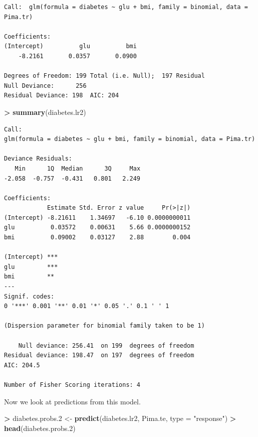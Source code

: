\documentclass[
]{krantz}
\makeatletter
\newenvironment{Shaded}{\begin{snugshade}}{\end{snugshade}}
\newcommand{\DataTypeTok}[1]{\textcolor[rgb]{0.27,0.27,0.27}{#1}}
\newcommand{\FloatTok}[1]{\textcolor[rgb]{0.06,0.06,0.06}{#1}}
\newcommand{\KeywordTok}[1]{\textcolor[rgb]{0.27,0.27,0.27}{\textbf{#1}}}
\newcommand{\NormalTok}[1]{#1}
\newcommand{\OperatorTok}[1]{\textcolor[rgb]{0.43,0.43,0.43}{\textbf{#1}}}
\newcommand{\StringTok}[1]{\textcolor[rgb]{0.5,0.5,0.5}{#1}}
\newenvironment{kframe}{%
\medskip{}
\setlength{\fboxsep}{.8em}
 \def\at@end@of@kframe{}%
 \ifinner\ifhmode%
  \def\at@end@of@kframe{\end{minipage}}%
  \begin{minipage}{\columnwidth}%
 \fi\fi%
 \def\FrameCommand##1{\hskip\@totalleftmargin \hskip-\fboxsep
 \colorbox{shadecolor}{##1}\hskip-\fboxsep
     \hskip-\linewidth \hskip-\@totalleftmargin \hskip\columnwidth}%
 \MakeFramed {\advance\hsize-\width
   \@totalleftmargin\z@ \linewidth\hsize
   \@setminipage}}%
 {\par\unskip\endMakeFramed%
 \at@end@of@kframe}
\renewenvironment{Shaded}{\begin{kframe}}{\end{kframe}}
\makeatother
\begin{document}
\begin{verbatim}
Call:  glm(formula = diabetes ~ glu + bmi, family = binomial, data = Pima.tr)

Coefficients:
(Intercept)          glu          bmi  
    -8.2161       0.0357       0.0900  

Degrees of Freedom: 199 Total (i.e. Null);  197 Residual
Null Deviance:      256 
Residual Deviance: 198  AIC: 204
\end{verbatim}

\begin{Shaded}
\begin{Highlighting}[]
\OperatorTok{\textgreater{}}\StringTok{ }\KeywordTok{summary}\NormalTok{(diabetes.lr2)}
\end{Highlighting}
\end{Shaded}

\begin{verbatim}
Call:
glm(formula = diabetes ~ glu + bmi, family = binomial, data = Pima.tr)

Deviance Residuals: 
   Min      1Q  Median      3Q     Max  
-2.058  -0.757  -0.431   0.801   2.249  

Coefficients:
            Estimate Std. Error z value     Pr(>|z|)
(Intercept) -8.21611    1.34697   -6.10 0.0000000011
glu          0.03572    0.00631    5.66 0.0000000152
bmi          0.09002    0.03127    2.88        0.004
               
(Intercept) ***
glu         ***
bmi         ** 
---
Signif. codes:  
0 '***' 0.001 '**' 0.01 '*' 0.05 '.' 0.1 ' ' 1

(Dispersion parameter for binomial family taken to be 1)

    Null deviance: 256.41  on 199  degrees of freedom
Residual deviance: 198.47  on 197  degrees of freedom
AIC: 204.5

Number of Fisher Scoring iterations: 4
\end{verbatim}

Now we look at predictions from this model.

\begin{Shaded}
\begin{Highlighting}[]
\OperatorTok{\textgreater{}}\StringTok{ }\NormalTok{diabetes.probs}\FloatTok{.2}\NormalTok{ \textless{}{-}}\StringTok{ }\KeywordTok{predict}\NormalTok{(diabetes.lr2, Pima.te, }\DataTypeTok{type =} \StringTok{"response"}\NormalTok{)}
\OperatorTok{\textgreater{}}\StringTok{ }\KeywordTok{head}\NormalTok{(diabetes.probs}\FloatTok{.2}\NormalTok{)}
\end{Highlighting}
\end{Shaded}
\end{document}
